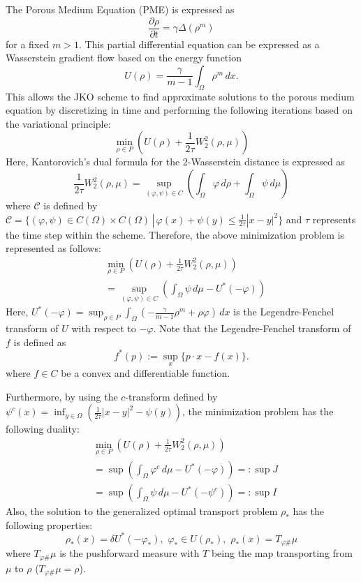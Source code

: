 \documentclass[a4,11pt, twocolumn, dvipdfmx]{article}
\theoremstyle{definition}
\begin{document}
The Porous Medium Equation (PME) is expressed as
\[
    \frac{\partial \rho}{\partial t} = \gamma \Delta(\rho^m)
\]
for a fixed \(m > 1\). 
This partial differential equation can be expressed as a Wasserstein gradient flow based on the energy function
\[
    U(\rho) = \frac{\gamma}{m-1} \int_{\Omega} \rho^m \,dx.
\]
This allows the JKO scheme to find approximate solutions to the porous medium equation by discretizing in time and performing the following iterations based on the variational principle:
\[
    \min_{\rho \in P} \left(U(\rho) + \frac{1}{2\tau} W_2^2(\rho, \mu)\right)
\]
Here, Kantorovich's dual formula for the 2-Wasserstein distance is expressed as
\[
    \frac{1}{2\tau} W_2^2(\rho, \mu) = \sup_{(\varphi, \psi) \in C} \left(\int_{\Omega} \varphi \,d\rho + \int_{\Omega} \psi \,d\mu\right)
\]
where \(\mathcal{C}\) is defined by 
\(\mathcal{C} = \{(\varphi, \psi) \in C(\Omega) \times C(\Omega) \,|\, \varphi(x) + \psi(y) \leq \frac{1}{2\tau} |x-y|^2\}\) 
and \(\tau\) represents the time step within the scheme. 
Therefore, the above minimization problem is represented as follows:
\begin{align*}
    &\min_{\rho \in P} \left(U(\rho) + \frac{1}{2\tau} W_2^2(\rho, \mu)\right)\\
     &= \sup_{(\varphi, \psi) \in C} \left(\int_{\Omega} \psi \,d\mu - U^*(-\varphi)\right)
\end{align*}
Here, 
\(U^*(-\varphi) = \sup_{\rho \in P} \int_{\Omega} \left(-\frac{\gamma}{m-1} \rho^m + \rho\varphi\right) \,dx\) 
is the Legendre-Fenchel transform of \(U\) with respect to \(-\varphi\). 
Note that the Legendre-Fenchel transform of $f$ is defined as
\begin{equation*}
    f^*(p) := \sup_x \{p \cdot x - f(x) \}.
\end{equation*}
where $f \in C$ be a convex and differentiable function. 

Furthermore, by using the \(c\)-transform defined by 
\(\psi^c(x) = \inf_{y \in \Omega} \left(\frac{1}{2\tau} |x-y|^2 - \psi(y)\right)\), 
the minimization problem has the following duality:
\begin{align*}
    &\min_{\rho \in P} \left(U(\rho) + \frac{1}{2\tau} W_2^2(\rho, \mu)\right) \\
    &= \sup\left(\int_{\Omega} \varphi^c \,d\mu - U^*(-\varphi)\right) =: \sup J\\
    &= \sup\left(\int_{\Omega} \psi \,d\mu - U^*(-\psi^c)\right) =: \sup I
\end{align*}
Also, the solution to the generalized optimal transport problem \(\rho_*\) has the following properties:
\[
    \rho_*(x) = \delta U^*(-\varphi_*), \,\, \varphi_* \in U(\rho_*), \,\, \rho_*(x) = T_{\varphi\#} \mu
\]
where \(T_{\varphi\#} \mu\) is the pushforward measure with \(T\) being the map transporting from \(\mu\) to \(\rho\) ($T_{\varphi\#} \mu = \rho$).
\end{document}
